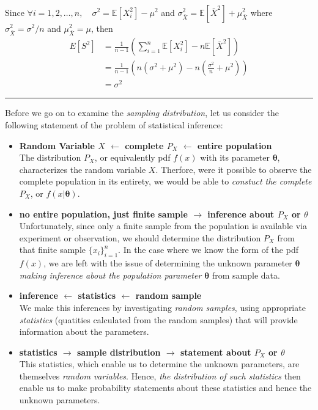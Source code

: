 \documentclass[twoside]{article}
\theoremstyle{definition}
\theoremstyle{remark}
\theoremstyle{remark}
\newenvironment{prf}{{\bf Proof:}}{\hfill\rule{2mm}{2mm}}
\begin{document}
\begin{prf}
\begin{enumerate}
\begin{equation*}
\begin{split}
      \end{split}
    \end{equation*}
    Since $\forall i = 1, 2, \ldots, n, \quad \sigma^2 = \mathbb{E}[X_i^2] - \mu^2$
    and $\sigma_{\bar{X}}^2 = \mathbb{E}[\bar{X}^2] + \mu_{\bar{X}}^2$ where
    $\sigma_{\bar{X}}^2 = \sigma^2 / n$ and $\mu_{\bar{X}}^2 = \mu$, then
    \begin{equation*}
      \begin{split}
        E[S^2]
        &= \frac{1}{n-1} \left( \sum_{i=1}^{n} \mathbb{E}[X_i^2]
         - n \mathbb{E}[\bar{X}^2] \right) \\
        &= \frac{1}{n-1} \left( n(\sigma^2 + \mu^2) - n (\frac{\sigma^2}{n} + \mu^2)\right) \\
        &= \sigma^2
      \end{split}
    \end{equation*}
  \end{enumerate}
\end{prf}

Before we go on to examine the \textit{sampling distribution}, let us consider
the following statement of the problem of statistical inference:
\begin{itemize}
  \item \textbf{Random Variable $X$ $\leftarrow$ complete $P_X$ $\leftarrow$ entire population} \\
  The distribution $P_X$, or equivalently pdf $f(x)$ with its parameter
  $\boldsymbol{\theta}$, characterizes the random variable $X$. Therfore, were
  it possible to observe the complete population in its entirety, we would be
  able to \textit{constuct the complete $P_X$}, or $f(x|\boldsymbol{\theta})$.
  \item \textbf{no entire population, just finite sample $\rightarrow$ inference about $P_X$ or $\theta$} \\
  Unfortunately, since only a finite sample from the population is
  available via experiment or observation, we should determine the distribution
  $P_X$ from that finite sample ${\{x_i\}}_{i=1}^{n}$. In the case where we
  know the form of the pdf $f(x)$, we are left with the issue of determining
  the unknown parameter $\boldsymbol{\theta}$ \textit{making inference about
  the population parameter $\boldsymbol{\theta}$} from sample data.
  \item \textbf{inference $\leftarrow$ statistics $\leftarrow$ random sample} \\
  We make this inferences by investigating \textit{random samples},
  using appropriate \textit{statistics} (quatities calculated from the random
  samples) that will provide information about the parameters.
  \item \textbf{statistics $\rightarrow$ sample distribution $\rightarrow$ statement about $P_X$ or $\theta$} \\
  This statistics, which enable us to determine the unknown parameters,
  are themselves \textit{random variables}. Hence, \textit{the distribution
  of such statistics} then enable us to make probability statements about
  these statistics and hence the unknown parameters.
\end{itemize}
\end{document}
